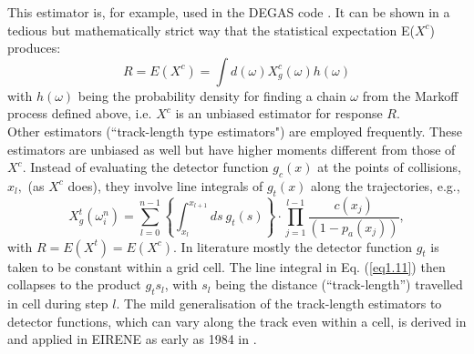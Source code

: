 This estimator is, for example, used in the DEGAS code
\cite{kn:Heifetz}. It can be shown \cite{kn:Spanier69a} in a tedious but mathematically strict way that the statistical
expectation E($X^c$) produces:
\begin{equation} \label{eq1.10}
R   =   E(X^c )   =   \int  d( \omega )   X^c_g ( \omega ) h( \omega
)
\end{equation}
with $h(\omega)$ being the probability density for finding a chain
$\omega$  from the Markoff process defined above, i.e. $X^c$ is an
unbiased estimator for response $R$.
\\
Other estimators (``track-length type estimators") are employed
frequently. These estimators are unbiased as well but have higher
moments different from those of $ X^c$. Instead of evaluating the
detector function $ g_c(x)$ at the points of collisions, $ x_l   ,
$ (as $ X^c$ does), they involve line integrals of $ g_t(x)$ along
the trajectories, e.g.,
\begin{equation} \label{eq1.11}
X^t_g ( \omega^{n}_i )   =    \sum_{l=0}^{n-1}   \left \{
\int_{x_l}^{x_{l+1}} ds \  g_t (s) \right \}
  \cdot   \prod_{j=1}^{l-1}
 \frac{c(x_j )}{(1 - p_a(x_j))}   ,
\end{equation}
with $ R   =   E(X^t )   =   E(X^c)$.
In literature mostly the detector function $g_t$ is taken to be constant within a grid cell.
The line integral in Eq. (\ref{eq1.11}) then collapses to the product $g_t s_l$, with $s_l$ being the distance
(``track-length'') travelled in cell during step $l$.
The mild generalisation of the track-length estimators
to detector functions, which can vary along the track even within a cell, is derived in
\cite{kn:Reiter84a} and applied in EIRENE as early as 1984 in \cite{kn:Reiter84b}.

